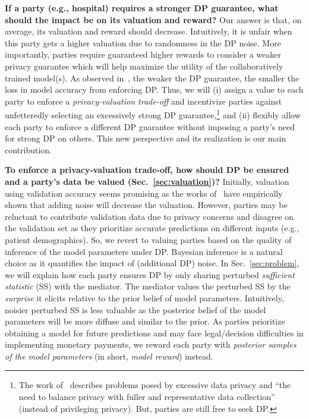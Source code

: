 \documentclass{article}
\DeclareRobustCommand{\hlp}[1]
{{#1}}
\theoremstyle{plain}
\theoremstyle{definition}
\theoremstyle{remark}
\renewcommand{\citet}[1]{\cite{#1}}
\begin{document}
{\bf If a party (e.g., hospital) requires a stronger DP guarantee, what should the impact be on its valuation and reward?} Our answer is that, on average, its valuation and reward should decrease.
\hlp{Intuitively, it is unfair when this party gets a higher valuation due to randomness in the DP noise.}
More importantly, parties require guaranteed higher rewards to consider a weaker privacy guarantee \cite{Dawn18,Yu21} which will help maximize the utility of the collaboratively trained model(s). As observed in~\citet{farrand2020neither,zhao2020tradeoff}, the weaker the DP guarantee, the smaller the loss in model accuracy from enforcing DP. Thus, we will (i) assign a value to each party to enforce a \emph{privacy-valuation trade-off} and incentivize parties against unfetteredly selecting an excessively strong DP guarantee,\footnote{The work of~\cite{lobel22} describes problems posed by excessive data privacy and ``the need to balance privacy with fuller and representative data collection'' (instead of privileging privacy).  But, parties are still free to seek DP.} and (ii) flexibly allow each party to enforce a different DP guarantee without imposing a party's need for strong DP on others. This new perspective and its realization is our main contribution.

{\bf To enforce a privacy-valuation trade-off, how should DP be ensured and a party's data be valued (Sec.~\ref{sec:valuation})?} 
Initially, valuation using validation accuracy seems promising as the works of~\citet{ghorbani2019data,jia2019towards} have empirically shown that adding noise will decrease the valuation. 
However, parties may be reluctant to contribute validation data due to privacy concerns and disagree on the validation set as they prioritize accurate predictions on different inputs (e.g., patient demographics). So, we revert to valuing parties based on the quality of inference of the model parameters under DP.
Bayesian inference is a natural choice as it quantifies the impact of (additional DP) noise.
In Sec.~\ref{sec:problem}, we will explain how each party ensures DP by only sharing perturbed \emph{sufficient statistic} (SS) with the mediator. The mediator values the perturbed SS by the \emph{surprise} it elicits relative to the prior belief of model parameters. 
\hlp{Intuitively, noisier perturbed SS is less valuable as the posterior belief of the model parameters will be more diffuse and similar to the prior.}
As parties prioritize obtaining a model for future predictions and may 
face legal/decision difficulties in implementing monetary payments,
we reward each party with \emph{posterior samples of the model parameters} (in short, \emph{model reward}) instead.
\end{document}
